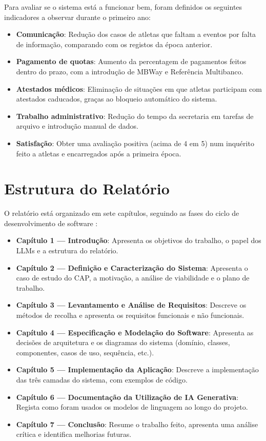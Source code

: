 Para avaliar se o sistema está a funcionar bem, foram definidos os seguintes indicadores a observar durante o primeiro ano:

\begin{itemize}
    \item \textbf{Comunicação}: Redução dos casos de atletas que faltam a eventos por falta de informação, comparando com os registos da época anterior.
    \item \textbf{Pagamento de quotas}: Aumento da percentagem de pagamentos feitos dentro do prazo, com a introdução de MBWay e Referência Multibanco.
    \item \textbf{Atestados médicos}: Eliminação de situações em que atletas participam com atestados caducados, graças ao bloqueio automático do sistema.
    \item \textbf{Trabalho administrativo}: Redução do tempo da secretaria em tarefas de arquivo e introdução manual de dados.
    \item \textbf{Satisfação}: Obter uma avaliação positiva (acima de 4 em 5) num inquérito feito a atletas e encarregados após a primeira época.
\end{itemize}

\section{Estrutura do Relatório}
O relatório está organizado em sete capítulos, seguindo as fases do ciclo de desenvolvimento de software \cite{sommerville2015}:

\begin{itemize}
    \item \textbf{Capítulo 1 --- Introdução}: Apresenta os objetivos do trabalho, o papel dos LLMs e a estrutura do relatório.

    \item \textbf{Capítulo 2 --- Definição e Caracterização do Sistema}: Apresenta o caso de estudo do CAP, a motivação, a análise de viabilidade e o plano de trabalho.

    \item \textbf{Capítulo 3 --- Levantamento e Análise de Requisitos}: Descreve os métodos de recolha e apresenta os requisitos funcionais e não funcionais.

    \item \textbf{Capítulo 4 --- Especificação e Modelação do Software}: Apresenta as decisões de arquitetura e os diagramas do sistema (domínio, classes, componentes, casos de uso, sequência, etc.).

    \item \textbf{Capítulo 5 --- Implementação da Aplicação}: Descreve a implementação das três camadas do sistema, com exemplos de código.

    \item \textbf{Capítulo 6 --- Documentação da Utilização de IA Generativa}: Regista como foram usados os modelos de linguagem ao longo do projeto.

    \item \textbf{Capítulo 7 --- Conclusão}: Resume o trabalho feito, apresenta uma análise crítica e identifica melhorias futuras.
\end{itemize}

